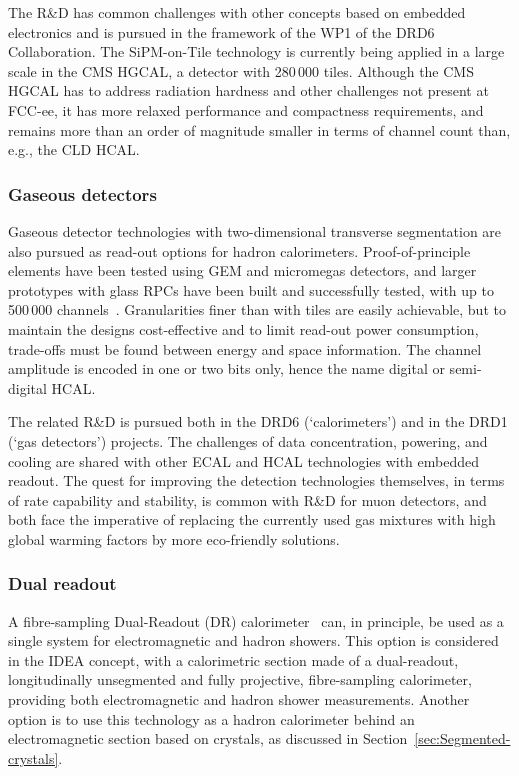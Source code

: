 The R\&D  has common challenges with other concepts based on embedded electronics 
and is pursued in the framework of the WP1 of the DRD6 Collaboration. 
The SiPM-on-Tile technology is currently being applied in a large scale in the CMS HGCAL, a detector with 280\,000 tiles.
Although the CMS HGCAL has to address radiation hardness and other challenges not present at FCC-ee, 
it has more relaxed performance and compactness requirements, 
and remains more than an order of magnitude smaller in terms of channel count than, e.g., the CLD HCAL.

\subsubsection{Gaseous detectors}

Gaseous detector technologies with two-dimensional transverse segmentation are also pursued as read-out options for hadron calorimeters. 
Proof-of-principle elements have been tested using GEM and micromegas detectors, 
and larger prototypes with glass RPCs have been built and successfully tested, 
with up to 500\,000 channels~\cite{Baulieu:2015pfa,Adams:2016por}. 
Granularities finer than with tiles are easily achievable, 
but to maintain the designs cost-effective and to limit read-out power consumption, 
trade-offs must be found between energy and space information. 
The channel amplitude is encoded in one or two bits only, hence the name digital or semi-digital HCAL.

The related R\&D is pursued both in the DRD6 (`calorimeters') and in the DRD1 (`gas detectors') projects. 
The challenges of data concentration, powering, and cooling are shared with other ECAL and HCAL technologies with embedded readout. 
The quest for improving the detection technologies themselves, in terms of rate capability and stability, 
is common with R\&D for muon detectors, 
and both face the imperative of replacing the currently used gas mixtures with high global warming factors 
by more eco-friendly solutions. 

\subsubsection{Dual readout}

A fibre-sampling Dual-Readout (DR) calorimeter~\cite{dualreadoutfibrecalo} can, in principle, 
be used as a single system for electromagnetic and hadron showers. 
This option is considered in the IDEA concept, 
with a calorimetric section made of a dual-readout, longitudinally unsegmented and fully projective, fibre-sampling calorimeter, 
providing both electromagnetic and hadron shower measurements.
Another option is to use this technology as a hadron calorimeter behind an electromagnetic section based on crystals, 
as discussed in Section~\ref{sec:Segmented-crystals}.


